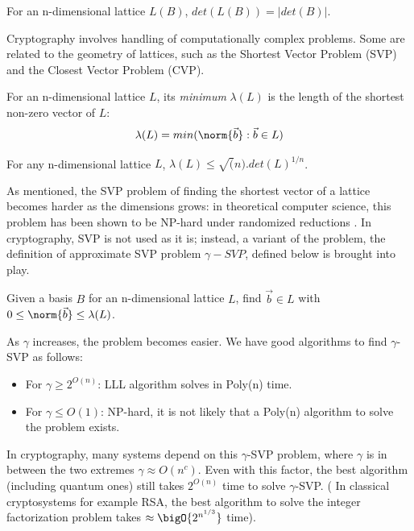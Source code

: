 \begin{lemma}
  For an n-dimensional lattice $L(B)$, $det(L(B)) = |det(B)|$.
  \label{lem:determinant2}
\end{lemma}
Cryptography involves handling of computationally complex problems. Some are related to the geometry of lattices, such as the Shortest
Vector Problem (SVP) and the Closest Vector Problem (CVP).
\begin{definition}
  For an n-dimensional lattice $L$, its \emph{minimum} $\lambda(L)$ is the
  length of the shortest non-zero vector of $L$:
  \[
    \lambda(L) = min(\norm{\vec{b}}: \vec{b} \in L)
  \]
  \label{def:minLattice}
\end{definition}
\begin{theorem}
   For any n-dimensional lattice $L$,
  $\lambda(L) \leq \sqrt(n).det(L)^{1/n}$.
  \label{the:minkowski1}
\end{theorem}
As mentioned, the SVP problem of finding the shortest vector of a lattice becomes harder as the dimensions
grows: in theoretical computer science, this problem has been shown to be NP-hard under randomized reductions \cite{ajtai1998shortest}. In cryptography, SVP is not used as it is; instead, a variant of the
problem, the definition of approximate SVP problem $\gamma-SVP$, defined below is brought into play.
\begin{definition}
   Given a basis $B$ for an n-dimensional lattice $L$,
  find $\vec{b} \in L$ with $0 \leq \norm{\vec{b}} \leq \lambda(L)$.
  \label{def:gammaSVP}
\end{definition}
As $\gamma$ increases, the problem becomes easier. We have good algorithms to
find $\gamma$-SVP as follows:
\begin{itemize}
\item For $\gamma \geq 2^{O(n)}$: LLL algorithm solves in Poly(n) time.
\item For $\gamma \leq O(1)$: NP-hard, it is not likely that a Poly(n) algorithm to solve the problem exists.
\end{itemize}
In cryptography, many systems depend on this $\gamma$-SVP problem, where
$\gamma$ is in between the two extremes $\gamma \approx O(n^c)$. Even with this
factor, the best algorithm (including quantum ones) still takes $2^{O(n)}$ time
to solve $\gamma$-SVP. ( In classical cryptosystems for example RSA, the best
algorithm to solve the integer factorization problem takes
$\approx \bigO{2^{n^{1/3}}}$ time).

